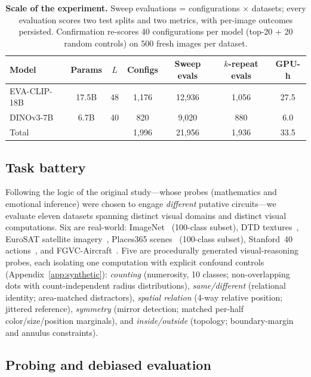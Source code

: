 \documentclass{article}
\newcommand{\eva}{EVA-CLIP-18B}
\newcommand{\dino}{DINOv3-7B}
\begin{document}
\begin{table}[t]
\caption{\textbf{Scale of the experiment.} Sweep evaluations =
configurations $\times$ datasets; every evaluation scores two test splits
and two metrics, with per-image outcomes persisted. Confirmation
re-scores 40 configurations per model (top-20 + 20 random controls) on
500 fresh images per dataset.}
\label{tab:scale}
\centering
\small
\begin{tabular}{lcccccc}
\toprule
Model & Params & $L$ & Configs & Sweep evals & $k$-repeat evals & GPU-h \\
\midrule
\eva{}~\citep{sun2024evaclip} & 17.5B & 48 & 1{,}176 & 12{,}936 & 1{,}056 & 27.5 \\
\dino{}~\citep{simeoni2025dinov3} & 6.7B & 40 & 820 & 9{,}020 & 880 & 6.0 \\
\midrule
Total & & & 1{,}996 & 21{,}956 & 1{,}936 & 33.5 \\
\bottomrule
\end{tabular}
\end{table}

\subsection{Task battery}
\label{sec:tasks}

Following the logic of the original study---whose probes (mathematics and
emotional inference) were chosen to engage \emph{different} putative
circuits---we evaluate eleven datasets spanning distinct visual domains
and distinct visual computations. Six are real-world:
ImageNet~\citep{deng2009imagenet} (100-class subset), DTD
textures~\citep{cimpoi2014describing}, EuroSAT satellite
imagery~\citep{helber2019eurosat}, Places365
scenes~\citep{zhou2018places} (100-class subset), Stanford~40
actions~\citep{yao2011human}, and FGVC-Aircraft~\citep{maji2013fine}.
Five are procedurally generated visual-reasoning probes, each isolating
one computation with explicit confound controls (Appendix~\ref{app:synthetic}):
\emph{counting} (numerosity, 10 classes; non-overlapping dots with
count-independent radius distributions), \emph{same/different}
(relational identity; area-matched distractors), \emph{spatial relation}
(4-way relative position; jittered reference), \emph{symmetry} (mirror
detection; matched per-half color/size/position marginals), and
\emph{inside/outside} (topology; boundary-margin and annulus
constraints).

\subsection{Probing and debiased evaluation}
\label{sec:probes}
\end{document}
